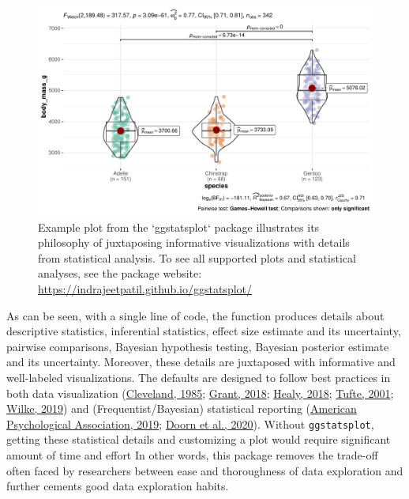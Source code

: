 \documentclass[
]{article}
\begin{document}
\begin{figure}
\includegraphics[width=1\linewidth]{paper_files/figure-latex/penguins-1} \caption{Example plot from the `ggstatsplot` package illustrates its philosophy of juxtaposing informative visualizations with details from statistical analysis. To see all supported plots and statistical analyses, see the package website: \url{https://indrajeetpatil.github.io/ggstatsplot/}}\label{fig:penguins}
\end{figure}

As can be seen, with a single line of code, the function produces
details about descriptive statistics, inferential statistics, effect
size estimate and its uncertainty, pairwise comparisons, Bayesian
hypothesis testing, Bayesian posterior estimate and its uncertainty.
Moreover, these details are juxtaposed with informative and well-labeled
visualizations. The defaults are designed to follow best practices in
both data visualization
(\protect\hyperlink{ref-cleveland1985}{Cleveland, 1985};
\protect\hyperlink{ref-grant2018data}{Grant, 2018};
\protect\hyperlink{ref-healy2018data}{Healy, 2018};
\protect\hyperlink{ref-tufte2001}{Tufte, 2001};
\protect\hyperlink{ref-wilke2019fundamentals}{Wilke, 2019}) and
(Frequentist/Bayesian) statistical reporting
(\protect\hyperlink{ref-apa2019}{American Psychological Association,
2019}; \protect\hyperlink{ref-van2020jasp}{Doorn et al., 2020}). Without
\texttt{ggstatsplot}, getting these statistical details and customizing
a plot would require significant amount of time and effort In other
words, this package removes the trade-off often faced by researchers
between ease and thoroughness of data exploration and further cements
good data exploration habits.
\end{document}
